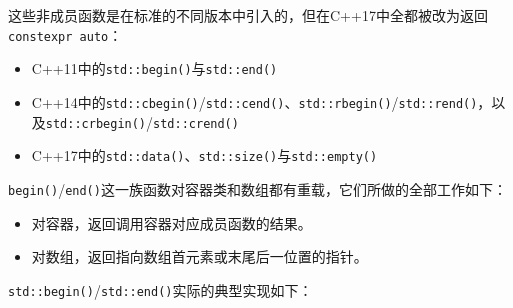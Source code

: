 
这些非成员函数是在标准的不同版本中引入的，但在C++17中全都被改为返回\texttt{constexpr auto}：



\begin{itemize}
\item C++11中的\texttt{std::\allowbreak{}begin()}与\texttt{std::\allowbreak{}end()}



\item C++14中的\texttt{std::\allowbreak{}cbegin()}/\texttt{std::\allowbreak{}cend()}、\texttt{std::\allowbreak{}rbegin()}/\texttt{std::\allowbreak{}rend()}，以及\texttt{std::\allowbreak{}crbegin()}/\texttt{std::\allowbreak{}crend()}



\item C++17中的\texttt{std::\allowbreak{}data()}、\texttt{std::\allowbreak{}size()}与\texttt{std::\allowbreak{}empty()}

\end{itemize}



\texttt{begin()}/\texttt{end()}这一族函数对容器类和数组都有重载，它们所做的全部工作如下：



\begin{itemize}
\item 对容器，返回调用容器对应成员函数的结果。



\item 对数组，返回指向数组首元素或末尾后一位置的指针。

\end{itemize}



\texttt{std::\allowbreak{}begin()}/\texttt{std::\allowbreak{}end()}实际的典型实现如下：



